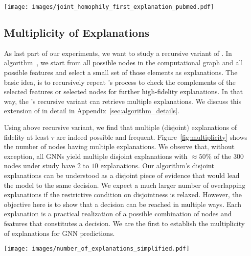 
\begin{figure*}
    \centering
    \texttt{[image: images/joint\_homophily\_first\_explanation\_pubmed.pdf]}
    \caption{Dataset - PubMed. The joint distribution of the homophily with respect to the nodes selected in the \approach{}'s explanation ($\tau=.85$) with true and predicted labels. The orange contour lines correspond to the distributions for correctly predicted nodes, and the blue one corresponds to incorrectly predicted nodes.}
    \label{fig:homophily_predictions}
\end{figure*}


\subsection{Multiplicity of Explanations}

As last part of our experiments, we want to study a recursive variant of \approach{}.
In algorithm~\label{alg:recursive}, we start from all possible nodes in the computational graph and all possible features and select a small set of those elements as explanations.
The basic idea, is to recursively repeat \approach{}'s process to check the complements of the selected features or selected nodes for further high-fidelity explanations. 
In that way, the \approach{}'s recursive variant can retrieve multiple explanations. 
We discuss this extension of \approach{} in detail in Appendix~\ref{sec:algorithm_details}.

Using above recursive variant, we find that
multiple (disjoint) explanations of fidelity at least $\tau$ are indeed possible and frequent. 
Figure~\ref{fig:multiplicity} shows the number of nodes having multiple explanations. 
We observe that, without exception, all GNNs yield multiple disjoint explanations with $\approx 50\%$ of the 300 nodes under study have $2$ to $10$ explanations.
Our algorithm's disjoint explanations can be understood as a disjoint piece of evidence that would lead the model to the same decision. 
We expect a much larger number of overlapping explanations if the restrictive condition on disjointness is relaxed. 
However, the objective here is to show that a decision can be reached in multiple ways. Each explanation is a practical realization of a possible combination of nodes and features that constitutes a decision.
We are the first to establish the multiplicity of explanations for GNN predictions.

\begin{figure*}
    \centering
    \texttt{[image: images/number\_of\_explanations\_simplified.pdf]}
    \caption{The number of explanations found with \approach{} at $\tau=0.85$.}
    \label{fig:multiplicity}
\end{figure*}